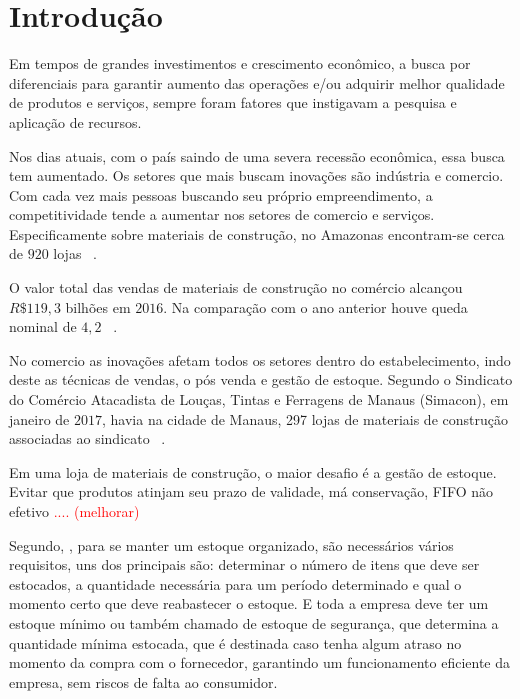 \section{Introdução}
\label{chapter:secao1}

\normalsize
Em tempos de grandes investimentos e crescimento econômico, a busca por diferenciais para garantir aumento das operações e/ou adquirir melhor qualidade de produtos e serviços, sempre foram fatores que instigavam a pesquisa e aplicação de recursos.

Nos dias atuais, com o país saindo de uma severa recessão econômica, essa busca tem aumentado. Os setores que mais buscam inovações são indústria e comercio. Com cada vez mais pessoas buscando seu próprio empreendimento, a competitividade tende a aumentar nos setores de comercio e serviços. Especificamente sobre materiais de construção, no Amazonas encontram-se cerca de $920$ lojas 
~\cite{AMANCO2014}.

O valor total das vendas de materiais de construção no comércio alcançou $R\$119,3$ bilhões em $2016$. Na comparação com o ano anterior houve queda nominal de $4,2$ ~\cite{ABRAMAT2017}.

No comercio as inovações afetam todos os setores dentro do estabelecimento, indo deste as técnicas de vendas, o pós venda e gestão de estoque. Segundo o Sindicato do Comércio Atacadista de Louças, Tintas e Ferragens de Manaus (Simacon), em janeiro de $2017$, havia na cidade de Manaus, 297 lojas de materiais de construção associadas ao sindicato ~\cite{SIMACON2017}.

Em uma loja de materiais de construção, o maior desafio é a gestão de estoque. Evitar que produtos atinjam seu prazo de validade, má conservação, FIFO não efetivo \textcolor{red}{.... (melhorar)}

Segundo, , para se manter um estoque organizado, são necessários vários requisitos, uns dos principais são: determinar o número de itens que deve ser estocados, a quantidade necessária para um período determinado e qual o momento certo que deve reabastecer o estoque. E toda a empresa deve ter um estoque mínimo ou também chamado de estoque de segurança, que determina a quantidade mínima estocada, que é destinada caso tenha algum atraso no momento da compra com o fornecedor, garantindo um funcionamento eficiente da empresa, sem riscos de falta ao consumidor.

